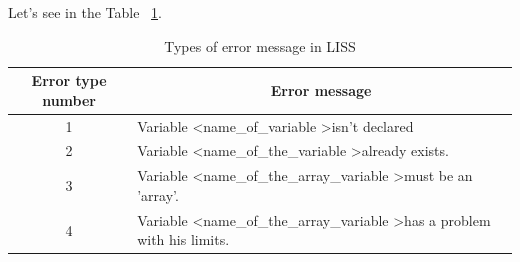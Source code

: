 \documentclass[
  oneside,
  11pt, a4paper,
  footinclude=true,
  headinclude=true,
  cleardoublepage=empty
]{scrbook}
\begin{document}
Let's see in the Table ~\ref{tbl:types_error_message}.

\newpage

\begin{table}[h!]
\centering
\caption{Types of error message in LISS}
\label{tbl:types_error_message}
\begin{tabular}{|c|l|}
\hline
\textbf{Error type number} & \multicolumn{1}{c|}{\textbf{Error message}}                                                                                                                                                                                                                                                                                                                                             \\ \hline
1                          & Variable \textless name\_of\_variable \textgreater isn't declared                                                                                                                                                                                                                                                                                                                       \\ \hline
2                          & Variable \textless name\_of\_the\_variable \textgreater already exists.                                                                                                                                                                                                                                                                                                                 \\ \hline
3                          & Variable \textless name\_of\_the\_array\_variable \textgreater must be an 'array'.                                                                                                                                                                                                                                                                                                      \\ \hline
4                          & Variable \textless name\_of\_the\_array\_variable \textgreater has a problem with his limits.                                                                                                                                                                                                                                                                                           \\ \hline

\end{tabular}
\end{table}
\end{document}
